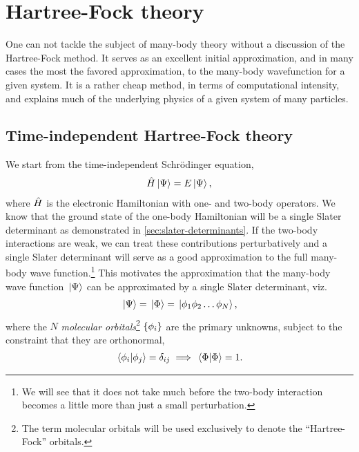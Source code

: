 \chapter{Hartree-Fock theory}
    \label{chap:hf}
    One can not tackle the subject of many-body theory without a discussion of
    the Hartree-Fock method.
    It serves as an excellent initial approximation, and in many cases the most
    the favored approximation, to the many-body wavefunction for a given system.
    It is a rather cheap method, in terms of computational intensity, and
    explains much of the underlying physics of a given system of many particles.

    \section{Time-independent Hartree-Fock theory}
        \label{sec:hf}
        We start from the time-independent Schrödinger equation,
        \begin{align}
            \hat{H}\ket*{\Psi} = E\ket*{\Psi},
        \end{align}
        where $\hat{H}$ is the electronic Hamiltonian with one- and two-body
        operators.
        We know that the ground state of the one-body Hamiltonian will be a
        single Slater determinant as demonstrated in
        \autoref{sec:slater-determinants}.
        If the two-body interactions are weak, we can treat these contributions
        perturbatively and a single Slater determinant will serve as a good
        approximation to the full many-body wave function.\footnote{%
            We will see that it does not take much before the two-body
            interaction becomes a little more than just a small perturbation.
        }
        This motivates the approximation that the many-body wave function
        $\ket*{\Psi}$ can be approximated by a single Slater determinant, viz.
        \begin{align}
            \ket*{\Psi} = \ket*{\Phi} = \ket*{\phi_1 \phi_2 \dots \phi_N},
        \end{align}
        where the $N$ \emph{molecular orbitals}\footnote{%
            The term molecular orbitals will be used exclusively to denote the
            ``Hartree-Fock'' orbitals.
        } $\left\{ \phi_i \right\}$ are the primary unknowns, subject to the constraint
        that they are orthonormal,
        \begin{align}
            \braket*{\phi_i}{\phi_j} = \delta_{ij}
            \implies
            \braket*{\Phi} = 1.
        \end{align}

